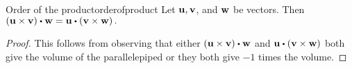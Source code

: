 \begin{proposition}{Order of the product}{orderofproduct}
Let ${\bf u},{\bf v}$, and ${\bf w}$ be vectors. Then $\tup{
\vect{u}\times \vect{v}} \dotprod \vect{w}=\vect{u}\dotprod \tup{\vect{v}\times \vect{w}
} .$
\end{proposition}

\begin{proof}This follows from observing that either 
$\tup{\vect{u}\times \vect{v}} \dotprod \vect{w}$ and $\vect{u}\dotprod 
\tup{\vect{v}\times \vect{w}} $ both give the volume of the parallelepiped or they both
give $-1$ times the volume.
\end{proof}

\begin{comment}
Recall that we can express the cross product as the determinant of a particular matrix. It turns out
that the same can be done for the box product. 
Suppose you have three vectors, $\vect{u}=\begin{mymatrix}{rrr}
a & b & c
\end{mymatrix}^T ,\vect{v}=\begin{mymatrix}{rrr}
 d & e & f
\end{mymatrix}^T ,$ and $\vect{w}=\begin{mymatrix}{rrr}
g & h & i
\end{mymatrix}^T .$ Then the box product $\vect{u}\dotprod \tup{\vect{v}\times \vect{w}}$ is given by the following.
\begin{eqnarray*}
\vect{u}\dotprod \tup{\vect{v}\times \vect{w}} &=&
\begin{mymatrix}{r}
a \\
b \\
c
\end{mymatrix} \dotprod \begin{absmatrix}{rrr}
\vect{i} & \vect{j} & \vect{k} \\
d & e & f \\
g & h & i
\end{absmatrix} \\
&=&a\begin{absmatrix}{rr}
e & f \\
h & i
\end{absmatrix} -b\begin{absmatrix}{rr}
d & f \\
g & i
\end{absmatrix} +c\begin{absmatrix}{rr}
d & e \\
g & h
\end{absmatrix} \\
&= &\det \begin{mymatrix}{rrr}
a & b & c \\
d & e & f \\
g & h & i
\end{mymatrix} 
\end{eqnarray*}


\end{comment}
